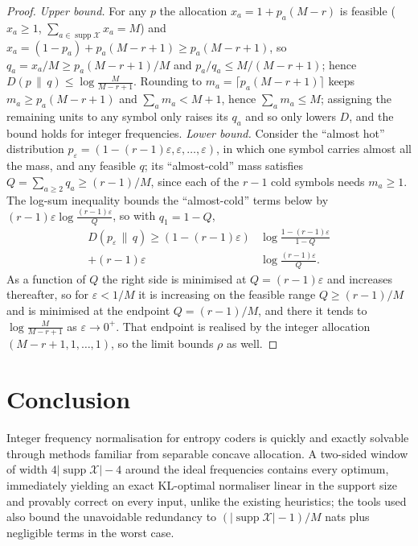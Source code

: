 \documentclass[final,5p]{elsarticle}
\DeclareMathOperator{\supp}{supp}
\begin{document}
\begin{proof}
\emph{Upper bound.} For any $p$ the allocation $x_a=1+p_a(M-r)$ is feasible
($x_a\ge1$, $\sum_{a\in \supp \mathcal X}x_a=M$) and
$x_a=(1-p_a)+p_a(M-r+1)\ge p_a(M-r+1)$, so $q_a=x_a/M\ge p_a(M-r+1)/M$ and
$p_a/q_a\le M/(M-r+1)$; hence $D(p\,\|\,q)\le\log\frac{M}{M-r+1}$. Rounding
to $m_a=\lceil p_a(M-r+1)\rceil$ keeps $m_a\ge p_a(M-r+1)$ and
$\sum_a m_a<M+1$, hence $\sum_a m_a\le M$; assigning the remaining units to any
symbol only raises its $q_a$ and so only lowers $D$, and the bound holds for
integer frequencies.
\emph{Lower bound.} Consider the ``almost hot'' distribution
$p_\varepsilon=(1-(r-1)\varepsilon,\varepsilon,\dots,\varepsilon)$, in which one
symbol carries almost all the mass, and any feasible $q$; its ``almost-cold''
mass satisfies $Q=\sum_{a\ge2}q_a\ge(r-1)/M$, since each of the $r-1$ cold
symbols needs $m_a\ge1$. The log-sum
inequality bounds the ``almost-cold'' terms below by
$(r-1)\varepsilon\log\frac{(r-1)\varepsilon}{Q}$, so with $q_1=1-Q$,
\begin{equation}
\begin{aligned}
   D(p_\varepsilon\,\|\,q)\ge
   (1-(r-1)\varepsilon)&\log\frac{1-(r-1)\varepsilon}{1-Q}\\
   +(r-1)\varepsilon&\log\frac{(r-1)\varepsilon}{Q}.
\end{aligned}
\end{equation}
As a function of $Q$ the right side is minimised at $Q=(r-1)\varepsilon$ and
increases thereafter, so for $\varepsilon<1/M$ it is increasing on the feasible
range $Q\ge(r-1)/M$ and is minimised at the endpoint $Q=(r-1)/M$, and there it tends
to $\log\frac{M}{M-r+1}$ as $\varepsilon\to0^+$. That endpoint is realised by the
integer allocation $(M-r+1,1,\dots,1)$, so the limit bounds $\rho$ as well.
\end{proof}

\section{Conclusion}
\label{sec:conclusion}
Integer frequency normalisation for entropy coders is quickly and exactly solvable through methods familiar from separable concave allocation. A two-sided window of width $4|\supp \mathcal X|-4$ around the ideal frequencies contains every optimum, immediately yielding an exact KL-optimal normaliser linear in the support size and provably correct on every input, unlike the existing heuristics; the tools used also bound the unavoidable redundancy to $(|\supp \mathcal X|-1)/M$ nats plus negligible terms in the worst case.


\end{document}
